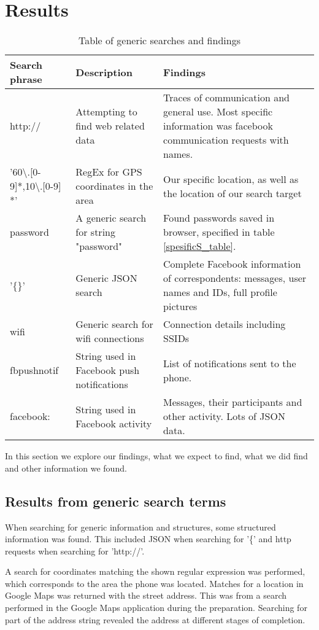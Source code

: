 \section{Results}
\begin{table}[H]
\centering
\begin{tabular}{|m{2cm}|m{2cm}|m{2.5cm}|}
\hline
Search phrase & Description & Findings \\
\hline
http:// & Attempting to find web related data  & Traces of communication and general use. Most specific information was facebook communication requests with names. \\
\hline
'60\textbackslash.[0-9]*,10\textbackslash.[0-9] *' &  RegEx for GPS coordinates in the area & Our specific location, as well as the location of our search target \\
\hline
password & A generic search for string "password" & Found passwords saved in browser, specified in table \ref{spesificS_table}. \\
\hline
'\{\}' & Generic JSON search & Complete Facebook information of correspondents: messages, user names and IDs, full profile pictures\\
\hline  
wifi & Generic search for wifi connections & Connection details including SSIDs \\  
\hline
fbpushnotif & String used in Facebook push notifications & List of notifications sent to the phone.\\
\hline
facebook: & String used in Facebook activity & Messages, their participants and other activity. Lots of JSON data.\\
\hline
\end{tabular}
\caption{Table of generic searches and findings}
\label{genericS_table}
\end{table}

In this section we explore our findings, what we expect to find, what we did find and other information we found. 

\subsection{Results from generic search terms}
When searching for generic information and structures, some structured information was found. This included JSON when searching for '\{' and http requests when searching for 'http://'.

A search for coordinates matching the shown regular expression was performed, which corresponds to the area the phone was located. Matches for a location in Google Maps was returned with the street address. This was from a search performed in the Google Maps application during the preparation. Searching for part of the address string revealed the address at different stages of completion.

